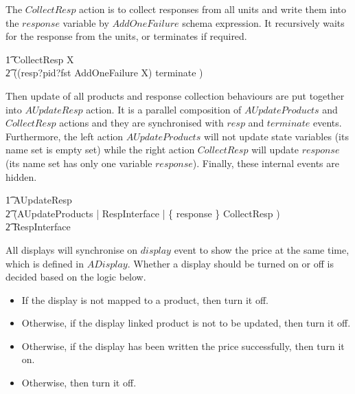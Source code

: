 The $CollectResp$ action is to collect responses from all units and write them into the $response$ variable by $AddOneFailure$ schema expression. It recursively waits for the response from the units, or terminates if required.
\begin{circusaction}
        \t1 CollectResp \circdef \circmu X \circspot \\ 
            \t2 ((resp?pid?fst \then \lschexpract AddOneFailure \rschexpract \circseq X) \extchoice terminate \then \Skip) \\
\end{circusaction}

Then update of all products and response collection behaviours are put together into $AUpdateResp$ action. It is a parallel composition of $AUpdateProducts$ and $CollectResp$ actions and they are synchronised with $resp$ and $terminate$ events. Furthermore, the left action $AUpdateProducts$ will not update state variables (its name set is empty set) while the right action $CollectResp$ will update $response$ (its name set has only one variable $response$). Finally, these internal events are hidden.
\begin{circusaction}
        \t1 AUpdateResp \circdef \\
        \t2 (AUpdateProducts \lpar \emptyset | RespInterface | \{ response \} \rpar CollectResp ) \\
        \t2 \circhide RespInterface \\
\end{circusaction}

All displays will synchronise on $display$ event to show the price at the same time, which is defined in $ADisplay$. Whether a display should be turned on or off is decided based on the logic below.
\begin{itemize}
    \item If the display is not mapped to a product, then turn it off.
    \item Otherwise, if the display linked product is not to be updated, then turn it off. 
    \item Otherwise, if the display has been written the price successfully, then turn it on. 
    \item Otherwise, then turn it off. 
\end{itemize}

